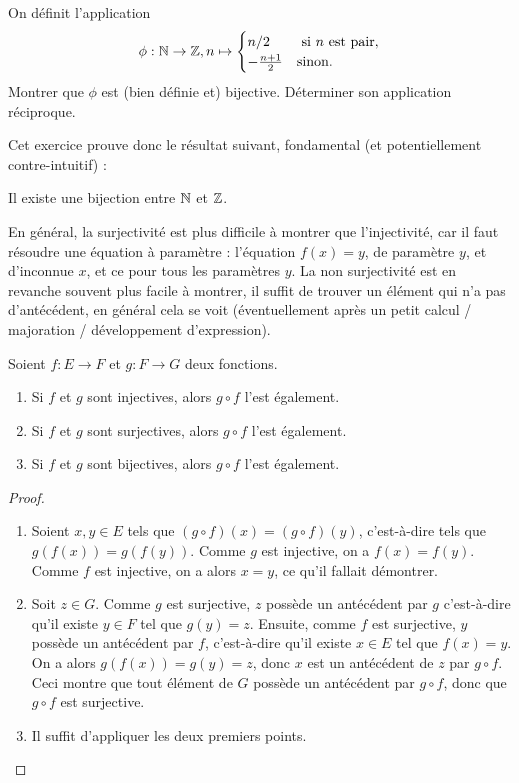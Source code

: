 \begin{exercice}
On définit l'application 
\[\phi : \mathbb{N}\to \mathbb{Z}, n\mapsto \begin{cases} n/2&\text{ si $n$ est pair},\\ -\frac{n+1}{2} & \text{sinon.}\end{cases}
\]
Montrer que $\phi$ est (bien définie et) bijective. Déterminer son application réciproque.
\end{exercice}

Cet exercice prouve donc le résultat suivant, fondamental (et potentiellement contre-intuitif) :

\begin{mdframed}[linewidth=2]
Il existe une bijection entre $\mathbb{N}$ et $\mathbb{Z}$.
\end{mdframed}


\begin{remarque}
En général, la surjectivité est plus difficile à montrer que l'injectivité, car il faut résoudre une équation à paramètre : l'équation $f(x)=y$, de paramètre $y$, et d'inconnue $x$, et ce pour tous les paramètres $y$. La non surjectivité est en revanche souvent plus facile à montrer, il suffit de trouver un élément qui n'a pas d'antécédent, en général cela se voit (éventuellement après un petit calcul / majoration / développement d'expression).
\end{remarque}


\begin{proposition}\label{prop-composition-inj-surj-bij}
Soient $f : E\to F$ et $g : F\to G$ deux fonctions.
\begin{enumerate}
\item Si $f$ et $g$ sont injectives, alors $g\circ f$ l'est également.
\item Si $f$ et $g$ sont surjectives, alors $g\circ f$ l'est également.
\item Si $f$ et $g$ sont bijectives, alors $g\circ f$ l'est également.
\end{enumerate}
\end{proposition}
\begin{proof}
\begin{enumerate}
\item Soient $x, y \in E$ tels que $(g\circ f)(x) = (g\circ f)(y) $, c'est-à-dire tels que $g(f(x))=g(f(y))$. Comme $g$ est injective, on a $f(x)=f(y)$. Comme $f$ est injective, on a alors $x=y$, ce qu'il fallait démontrer.
\item Soit $z\in G$. Comme $g$ est surjective, $z$ possède un antécédent par $g$ c'est-à-dire qu'il existe $y\in F$ tel que $g(y)=z$. Ensuite, comme $f$ est surjective, $y$ possède un antécédent par $f$, c'est-à-dire qu'il existe $x\in E$ tel que $f(x)=y$. On a alors $g(f(x)) = g(y)=z$, donc $x$ est un antécédent de $z$ par $g\circ f$. Ceci montre que tout élément de $G$ possède un antécédent par $g\circ f$, donc que $g\circ f$ est surjective.
\item Il suffit d'appliquer les deux premiers points.
\end{enumerate}
\end{proof}



